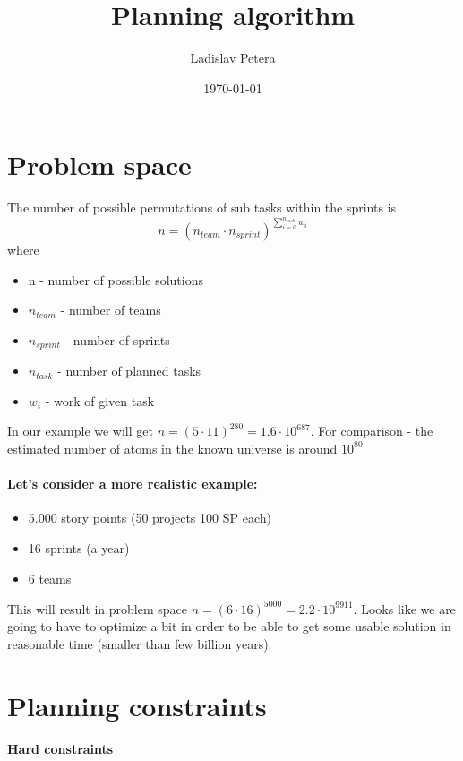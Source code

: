 \documentclass[10pt,a4paper]{article}
\title{Planning algorithm}
\author{Ladislav Petera}
\date{\today}
\begin{document}
\maketitle

\section{Problem space}

The number of possible permutations of sub tasks within the sprints is
$$n = (n_{team} \cdot n_{sprint}) ^{\sum_{i=0}^{n_{task}}{w_i}} $$ where
\begin{itemize}
\item n - number of possible solutions
\item $n_{team}$ - number of teams
\item $n_{sprint}$ - number of sprints
\item $n_{task}$ - number of planned tasks
\item $w_i$ - work of given task
\end{itemize}

In our example we will get $n = (5 \cdot 11) ^{280} = 1.6 \cdot 10^{687}$.
For comparison - the estimated number of atoms in the known universe is around $10^{80}$

\paragraph{Let's consider a more realistic example:}

\begin{itemize}
\item 5.000 story points (50 projects 100 SP each)
\item 16 sprints (a year)
\item 6 teams
\end{itemize}

This will result in problem space $n = (6 \cdot 16) ^{5000} = 2.2 \cdot 10^{9911}$.
Looks like we are going to have to optimize a bit in order to be able to get some usable solution in reasonable time (smaller than few billion years).

\section{Planning constraints}

\paragraph{Hard constraints}
\end{document}
